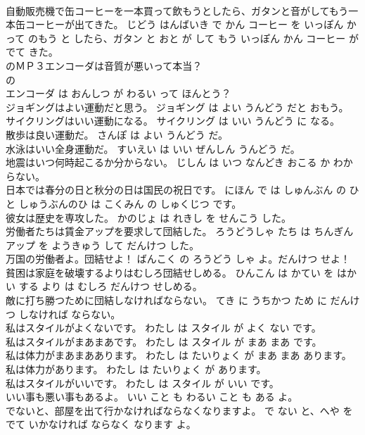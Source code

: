 \documentclass[8pt]{extreport}
\begin{document}
\begin{CJK}{UTF8}{min}
\\	自動販売機で缶コーヒーを一本買って飲もうとしたら、ガタンと音がしてもう一本缶コーヒーが出てきた。	じどう はんばいき で かん コーヒー を いっぽん かって のもう と したら、ガタン と おと が して もう いっぽん かん コーヒー が でて きた。	
\\	のＭＰ３エンコーダは音質が悪いって本当？	
\\	の 
\\	エンコーダ は おんしつ が わるい って ほんとう？	
\\	ジョギングはよい運動だと思う。	ジョギング は よい うんどう だと おもう。	
\\	サイクリングはいい運動になる。	サイクリング は いい うんどう に なる。	
\\	散歩は良い運動だ。	さんぽ は よい うんどう だ。	
\\	水泳はいい全身運動だ。	すいえい は いい ぜんしん うんどう だ。	
\\	地震はいつ何時起こるか分からない。	じしん は いつ なんどき おこる か わからない。	
\\	日本では春分の日と秋分の日は国民の祝日です。	にほん で は しゅんぶん の ひ と しゅうぶんのひ は こくみん の しゅくじつ です。	
\\	彼女は歴史を専攻した。	かのじょ は れきし を せんこう した。	
\\	労働者たちは賃金アップを要求して団結した。	ろうどうしゃ たち は ちんぎん アップ を ようきゅう して だんけつ した。	
\\	万国の労働者よ。団結せよ！	ばんこく の ろうどう しゃ よ。だんけつ せよ！	
\\	貧困は家庭を破壊するよりはむしろ団結せしめる。	ひんこん は かてい を はかい する より は むしろ だんけつ せしめる。	
\\	敵に打ち勝つために団結しなければならない。	てき に うちかつ ため に だんけつ しなければ ならない。	
\\	私はスタイルがよくないです。	わたし は スタイル が よく ない です。	
\\	私はスタイルがまあまあです。	わたし は スタイル が まあ まあ です。	
\\	私は体力がまあまああります。	わたし は たいりょく が まあ まあ あります。	
\\	私は体力があります。	わたし は たいりょく が あります。	
\\	私はスタイルがいいです。	わたし は スタイル が いい です。	
\\	いい事も悪い事もあるよ。	いい こと も わるい こと も ある よ。	
\\	でないと、部屋を出て行かなければならなくなりますよ。	で ない と、へや を でて いかなければ ならなく なります よ。	

\end{CJK}
\end{document}
